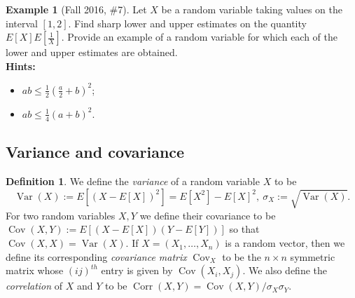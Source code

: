 \documentclass[12pt,reqno]{article}
\renewcommand{\emph}[1]{\textit{#1}}
\theoremstyle{plain}
\theoremstyle{definition}
\newtheorem{definition}[theorem]{Definition}
\newtheorem{example}[theorem]{Example}
\begin{document}
\begin{example}[Fall 2016, \#7]
Let $X$ be a random variable taking values on the interval $[1,2]$. 
Find sharp lower and upper estimates on the quantity 
$E[X] E[\frac{1}{X}]$. Provide an example of a random variable for which 
each of the lower and upper estimates are obtained. \\
\textbf{Hints:} 
\begin{itemize} 

\item $ab \leq \frac{1}{2}\left(\frac{a}{2}+b\right)^2$; 
\item $ab \leq \frac{1}{4}(a+b)^2$. 

\end{itemize} 
\end{example} 

\subsection{Variance and covariance} 

\begin{definition} 
We define the \emph{variance} of a random variable $X$ to be 
\[
\operatorname{Var}(X) := E[(X - E[X])^2] = E[X^2] - E[X]^2,\ 
     \sigma_X := \sqrt{\operatorname{Var}(X)}. 
\]
For two random variables $X,Y$ we define their covariance to be 
$\operatorname{Cov}(X, Y) := E[(X-E[X])(Y-E[Y])]$ so that 
$\operatorname{Cov}(X, X) = \operatorname{Var}(X)$. 
If $X = (X_1,\ldots,X_n)$ is a random vector, then we define its 
corresponding \emph{covariance matrix} $\operatorname{Cov}_X$ to be the 
$n \times n$ symmetric matrix whose $(ij)^{th}$ entry is given by 
$\operatorname{Cov}(X_i, X_j)$. 
We also define the \emph{correlation} of $X$ and $Y$ to be 
$\operatorname{Corr}(X, Y) = \operatorname{Cov}(X, Y) / \sigma_X\sigma_Y$. 
\end{definition} 
\end{document}
